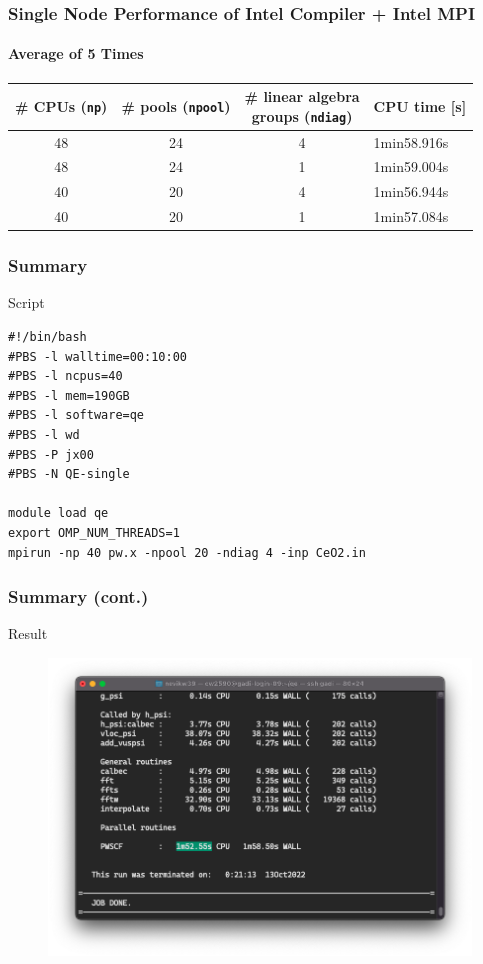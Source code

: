 \documentclass{beamer}
\begin{document}
\begin{frame}
	\frametitle{Single Node Performance of Intel Compiler + Intel MPI}
	\framesubtitle{Average of 5 Times}
    \begin{table}
        \centering
        \begin{tabular}{cccl}
           \# CPUs (\texttt{np})  & \# pools (\texttt{npool}) & \makecell{\# linear algebra\\ groups (\texttt{ndiag})} & CPU time [s] \\
            \hline
            48 & 24 & 4 & 1min58.916s\\
            48 & 24 & 1 & 1min59.004s\\
            40 & 20 & 4 & 1min56.944s\\
            40 & 20 & 1 & 1min57.084s\\
        \end{tabular}
        \label{tab:qe-single-intel}
    \end{table}
\end{frame}

\begin{frame}[fragile]
    \frametitle{Summary}
    \begin{exampleblock}{Script}
        \begin{lstlisting}
#!/bin/bash
#PBS -l walltime=00:10:00
#PBS -l ncpus=40
#PBS -l mem=190GB
#PBS -l software=qe
#PBS -l wd
#PBS -P jx00
#PBS -N QE-single

module load qe
export OMP_NUM_THREADS=1
mpirun -np 40 pw.x -npool 20 -ndiag 4 -inp CeO2.in
        \end{lstlisting}
    \end{exampleblock}
\end{frame}

\begin{frame}[fragile]
    \frametitle{Summary (cont.)}
    
    \begin{alertblock}{Result}
        \begin{figure}
            \includegraphics[width=.75\linewidth]{qe-single}
        \end{figure}
    \end{alertblock}
\end{frame}
\end{document}
